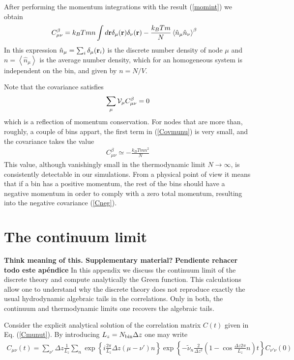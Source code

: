 \documentclass[b5paper,openright,11pt]{book}
\newcommand{\Note}[1]{{\bf \color{red}#1}}    %
\newcommand{\llangle}{\left\langle}
\newcommand{\rrangle}{\right\rangle}
\begin{document}
\begin{appendices}
After performing the momentum integrations with the result (\ref{momint})
we obtain
\begin{align}
  C_{\mu\nu}^\beta&=k_BTm n\int d{\bf r}\delta_\mu({\bf r})\delta_\nu({\bf r})
-\frac{k_BTm}{N}\llangle \hat{n}_\mu\hat{n}_\nu\rrangle^{\beta}
\label{Covmunu}
\end{align}
 In this expression $\hat{n}_\mu=\sum_i\delta_\mu({\bf r}_i)$ is the discrete
number density of node $\mu$ and $n=\llangle \hat{n}_\mu\rrangle$ is the average
number density, which for an homogeneous system is independent on the bin, and
given by $n=N/V$.

Note that the covariance satisfies
\begin{align}
  \sum_\mu {\cal V}_\mu C_{\mu\nu}^\beta=0
\end{align}
which is  a reflection of  momentum conservation.  For nodes  that are
more  than, roughly,  a  couple  of bins  appart,  the  first term  in
(\ref{Covmunu}) is very small, and the covariance takes the value
\begin{align}
  C_{\mu\nu}^\beta\simeq -\frac{k_BTm n^2}{N}
\label{Cneg}
\end{align}
This  value, although  vanishingly  small in  the thermodynamic  limit
$N\to\infty$, is  consistently detectable  in our simulations.  From a
physical point of view it means that if a bin has a positive momentum,
the  rest of  the bins  should have  a negative  momentum in  order to
comply  with  a  zero  total momentum,  resulting  into  the  negative
covariance (\ref{Cneg}).


\chapter{The continuum limit}
\label{Ap:Cont}
\Note{Think meaning of this. Supplementary material?}
\Note{Pendiente rehacer todo este apéndice}
In this appendix we discuss the continuum limit of the discrete theory
and compute analytically the  Green function.  This calculations allow
one to understand  why the discrete theory does  not reproduce exactly
the usual hydrodynamic  algebraic tails in the  correlations.  Only in
both,  the  continuum  and   thermodynamic  limits  one  recovers  the
algebraic tails.

Consider the  explicit analytical  solution of the  correlation matrix
$C(t)$  given  in  Eq. (\ref{Cmunut}).   By  introducing  $L_z={N_{\rm
    bin}}\Delta z$ one may write
\begin{align}
  C_{\mu\nu}(t)=\sum_{\nu'}\Delta z \frac{1}{L_z}\sum_{n}\exp\left\{i\frac{2\pi}{L_z}\Delta z (\mu-\nu')n\right\}
\exp\left\{-\tilde{\nu}_n\frac{2}{\Delta z^2}\left(1-\cos\frac{\Delta z 2\pi}{L_z}n\right)t\right\}C_{\nu'\nu}(0)
\end{align}


\end{appendices}
\end{document}
